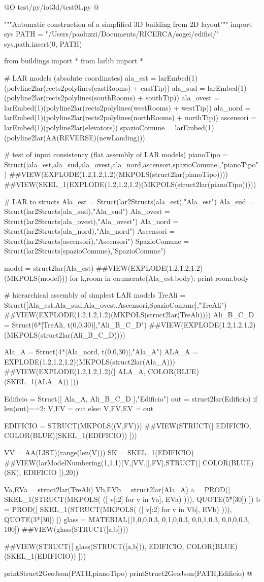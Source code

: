 \documentclass[11pt,oneside]{article}	%
\begin{document}
@O test/py/iot3d/test01.py
@{"""Automatic construction of a simplified 3D building from 2D layout"""
import sys
PATH = "/Users/paoluzzi/Documents/RICERCA/sogei/edifici/"
sys.path.insert(0, PATH)

from buildings import *
from larlib import *

# LAR models (absolute coordinates)
ala_est = larEmbed(1)(polyline2lar(rects2polylines(eastRooms) + eastTip))
ala_sud = larEmbed(1)(polyline2lar(rects2polylines(southRooms) + southTip))
ala_ovest = larEmbed(1)(polyline2lar(rects2polylines(westRooms) + westTip))
ala_nord = larEmbed(1)(polyline2lar(rects2polylines(northRooms) + northTip)) 
ascensori = larEmbed(1)(polyline2lar(elevators))
spazioComune = larEmbed(1)(polyline2lar(AA(REVERSE)(newLanding)))

# test of input consistency (flat assembly of LAR models)
pianoTipo = Struct([ala_est,ala_sud,ala_ovest,ala_nord,ascensori,spazioComune],"pianoTipo")
##VIEW(EXPLODE(1.2,1.2,1.2)(MKPOLS(struct2lar(pianoTipo))))
##VIEW(SKEL_1(EXPLODE(1.2,1.2,1.2)(MKPOLS(struct2lar(pianoTipo)))))

# LAR to structs
Ala_est = Struct(lar2Structs(ala_est),"Ala_est")
Ala_sud = Struct(lar2Structs(ala_sud),"Ala_sud")
Ala_ovest = Struct(lar2Structs(ala_ovest),"Ala_ovest")
Ala_nord = Struct(lar2Structs(ala_nord),"Ala_nord")
Ascensori = Struct(lar2Structs(ascensori),"Ascensori")
SpazioComune = Struct(lar2Structs(spazioComune),"SpazioComune")

model = struct2lar(Ala_est)
##VIEW(EXPLODE(1.2,1.2,1.2)(MKPOLS(model)))
for k,room in enumerate(Ala_est.body):
	print room.body

# hierarchical assembly of simplest LAR models
TreAli = Struct([Ala_est,Ala_sud,Ala_ovest,Ascensori,SpazioComune],"TreAli")
##VIEW(EXPLODE(1.2,1.2,1.2)(MKPOLS(struct2lar(TreAli))))
Ali_B_C_D = Struct(6*[TreAli, t(0,0,30)],"Ali_B_C_D")
##VIEW(EXPLODE(1.2,1.2,1.2)(MKPOLS(struct2lar(Ali_B_C_D))))

Ala_A = Struct(4*[Ala_nord,  t(0,0,30)],"Ala_A")
ALA_A = EXPLODE(1.2,1.2,1.2)(MKPOLS(struct2lar(Ala_A)))
##VIEW(EXPLODE(1.2,1.2,1.2)([ ALA_A, COLOR(BLUE)(SKEL_1(ALA_A)) ]))

Edificio = Struct([ Ala_A, Ali_B_C_D ],"Edificio")
out = struct2lar(Edificio)
if len(out)==2: V,FV = out
else: V,FV,EV = out

EDIFICIO = STRUCT(MKPOLS((V,FV)))
##VIEW(STRUCT([ EDIFICIO, COLOR(BLUE)(SKEL_1(EDIFICIO)) ]))

VV = AA(LIST)(range(len(V)))
SK = SKEL_1(EDIFICIO)
##VIEW(larModelNumbering(1,1,1)(V,[VV,[],FV],STRUCT([ COLOR(BLUE)(SK), EDIFICIO ]),20))

Va,EVa = struct2lar(TreAli)
Vb,EVb = struct2lar(Ala_A)
a = PROD([ SKEL_1(STRUCT(MKPOLS( ([ v[:2] for v in Va], EVa) ))), QUOTE(5*[30]) ])
b = PROD([ SKEL_1(STRUCT(MKPOLS( ([ v[:2] for v in Vb], EVb) ))), QUOTE(3*[30]) ])
glass = MATERIAL([1,0,0,0.3,  0,1,0,0.3,  0,0,1,0.3, 0,0,0,0.3, 100])
##VIEW(glass(STRUCT([a,b])))

##VIEW(STRUCT([ glass(STRUCT([a,b])), EDIFICIO, COLOR(BLUE)(SKEL_1(EDIFICIO)) ]))


printStruct2GeoJson(PATH,pianoTipo)
printStruct2GeoJson(PATH,Edificio)
@}
\end{document}
